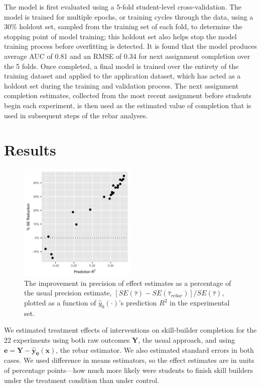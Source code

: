\documentclass{edm_template}
\newcommand{\tauhat}{\hat{\tau}}
\newcommand{\rebar}{\hat{\tau}_{rebar}}
\newcommand{\model}{\hat{y}_0(\cdot)}
\newcommand{\pred}{\hat{y}_0(\bm{x})}
\begin{document}
The model is first evaluated using a 5-fold student-level cross-validation. The model is trained for multiple epochs, or training cycles through the data, using a 30\% holdout set, sampled from the training set of each fold, to determine the stopping point of model training; this holdout set also helps stop the model training process before overfitting is detected. It is found that the model produces average AUC of 0.81 and an RMSE of 0.34 for next assignment completion over the 5 folds. Once completed, a final model is trained over the entirety of the training dataset and applied to the application dataset, which has acted as a holdout set during the training and validation process. The next assignment completion estimates, collected from the most recent assignment before students begin each experiment, is then used as the estimated value of completion that is used in subsequent steps of the rebar analyses.


\section{Results}\label{sec:results}

\begin{figure}
\centering
\includegraphics[width=0.5\textwidth]{corVsSE.jpg}
\caption{The improvement in precision of effect estimates as a percentage of the usual precision estimate, $[SE(\tauhat)-SE(\rebar)]/SE(\tauhat)$, plotted as a function of $\model$'s prediction $R^2$ in the experimental set.}
\label{fig:r2se}
\end{figure}

We estimated treatment effects of interventions on skill-builder completion for the 22 experiments using both raw outcomes $\bm{Y}$, the usual approach, and using $\bm{e}=\bm{Y}-\bm{\pred}$, the rebar estimator. 
We also estimated standard errors in both cases.
We used difference in means estimators, so the effect estimates are in units of percentage points---how much more likely were students to finish skill builders under the treatment condition than under control. 
\end{document}
